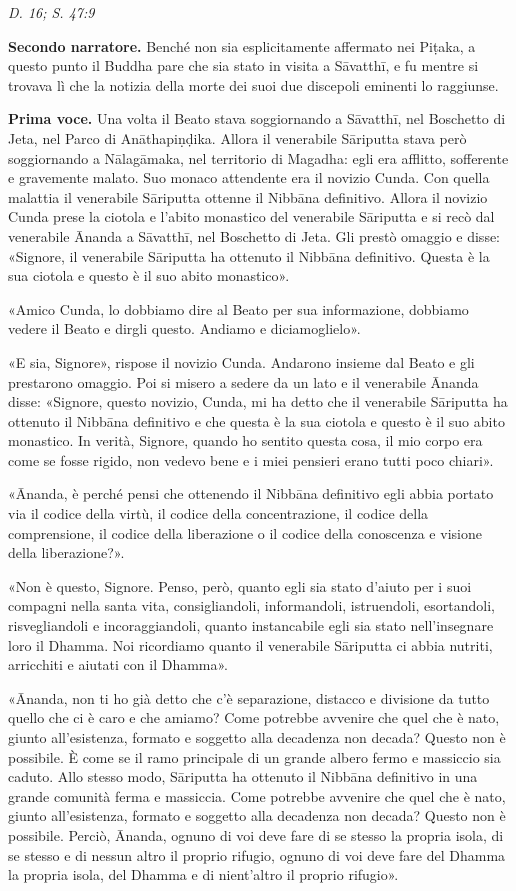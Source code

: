 \emph{D. 16; S. 47:9}


\textbf{Secondo narratore.} Benché non sia esplicitamente affermato nei Piṭaka, a
questo punto il Buddha pare che sia stato in visita a Sāvatthī, e fu
mentre si trovava lì che la notizia della morte dei suoi due discepoli
eminenti lo raggiunse.


\textbf{Prima voce.} Una volta il Beato stava soggiornando a Sāvatthī, nel
Boschetto di Jeta, nel Parco di Anāthapiṇḍika. Allora il venerabile
Sāriputta stava però soggiornando a Nālagāmaka, nel territorio di
Magadha: egli era afflitto, sofferente e gravemente malato. Suo monaco
attendente era il novizio Cunda. Con quella malattia il venerabile
Sāriputta ottenne il Nibbāna definitivo. Allora il novizio Cunda prese
la ciotola e l’abito monastico del venerabile Sāriputta e si recò dal
venerabile Ānanda a Sāvatthī, nel Boschetto di Jeta. Gli prestò omaggio
e disse: «Signore, il venerabile Sāriputta ha ottenuto il Nibbāna
definitivo. Questa è la sua ciotola e questo è il suo abito monastico».


«Amico Cunda, lo dobbiamo dire al Beato per sua informazione, dobbiamo
vedere il Beato e dirgli questo. Andiamo e diciamoglielo».


«E sia, Signore», rispose il novizio Cunda. Andarono insieme dal Beato e
gli prestarono omaggio. Poi si misero a sedere da un lato e il
venerabile Ānanda disse: «Signore, questo novizio, Cunda, mi ha detto
che il venerabile Sāriputta ha ottenuto il Nibbāna definitivo e che
questa è la sua ciotola e questo è il suo abito monastico. In verità,
Signore, quando ho sentito questa cosa, il mio corpo era come se fosse
rigido, non vedevo bene e i miei pensieri erano tutti poco chiari».


«Ānanda, è perché pensi che ottenendo il Nibbāna definitivo egli abbia
portato via il codice della virtù, il codice della concentrazione, il
codice della comprensione, il codice della liberazione o il codice della
conoscenza e visione della liberazione?».


«Non è questo, Signore. Penso, però, quanto egli sia stato d’aiuto per i
suoi compagni nella santa vita, consigliandoli, informandoli,
istruendoli, esortandoli, risvegliandoli e incoraggiandoli, quanto
instancabile egli sia stato nell’insegnare loro il Dhamma. Noi
ricordiamo quanto il venerabile Sāriputta ci abbia nutriti, arricchiti e
aiutati con il Dhamma».


«Ānanda, non ti ho già detto che c’è separazione, distacco e divisione
da tutto quello che ci è caro e che amiamo? Come potrebbe avvenire che
quel che è nato, giunto all’esistenza, formato e soggetto alla decadenza
non decada? Questo non è possibile. È come se il ramo principale di un
grande albero fermo e massiccio sia caduto. Allo stesso modo, Sāriputta
ha ottenuto il Nibbāna definitivo in una grande comunità ferma e
massiccia. Come potrebbe avvenire che quel che è nato, giunto
all’esistenza, formato e soggetto alla decadenza non decada? Questo non
è possibile. Perciò, Ānanda, ognuno di voi deve fare di se stesso la
propria isola, di se stesso e di nessun altro il proprio rifugio, ognuno
di voi deve fare del Dhamma la propria isola, del Dhamma e di
nient’altro il proprio rifugio».


